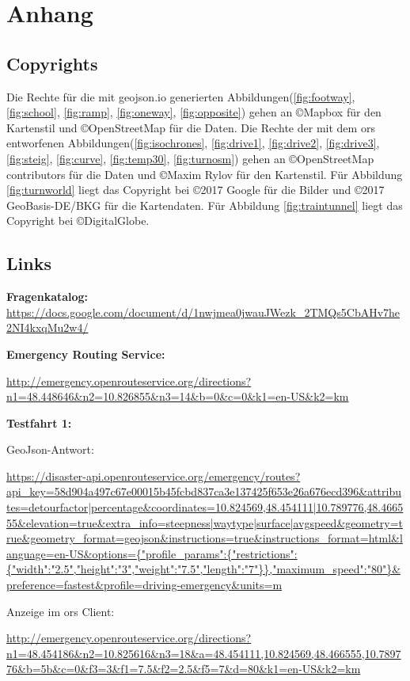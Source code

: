 \section{Anhang}
\label{sec:anhang}
\subsection*{Copyrights}
Die Rechte für die mit geojson.io generierten Abbildungen(\ref{fig:footway}, \ref{fig:school}, \ref{fig:ramp}, \ref{fig:oneway}, \ref{fig:opposite}) gehen an \copyright Mapbox für den Kartenstil und \copyright OpenStreetMap für die Daten.
\newline Die Rechte der mit dem \gls{ors} entworfenen Abbildungen(\ref{fig:isochrones}, \ref{fig:drive1}, \ref{fig:drive2}, \ref{fig:drive3}, \ref{fig:steig}, \ref{fig:curve}, \ref{fig:temp30}, \ref{fig:turnosm}) gehen an \copyright OpenStreetMap contributors für die Daten und \copyright Maxim Rylov für den Kartenstil.
Für Abbildung \ref{fig:turnworld} liegt das Copyright bei \copyright 2017 Google für die Bilder und \copyright 2017 GeoBasis-DE/BKG für die Kartendaten.
Für Abbildung \ref{fig:traintunnel} liegt das Copyright bei \copyright DigitalGlobe.

\subsection*{Links}
\textbf{Fragenkatalog:}
\sloppy
\url{https://docs.google.com/document/d/1nwjmea0jwauJWezk\_2TMQs5CbAHv7he2NI4kxqMu2w4/}
\medskip

\textbf{Emergency Routing Service:}

\url{http://emergency.openrouteservice.org/directions?n1=48.448646\&n2=10.826855\&n3=14\&b=0\&c=0\&k1=en-US\&k2=km}
\medskip

\textbf{Testfahrt 1:}

GeoJson-Antwort:\par
\url{https://disaster-api.openrouteservice.org/emergency/routes?api_key=58d904a497c67e00015b45fcbd837ca3e137425f653e26a676ecd396&attributes=detourfactor|percentage&coordinates=10.824569,48.454111|10.789776,48.466555&elevation=true&extra_info=steepness|waytype|surface|avgspeed&geometry=true&geometry_format=geojson&instructions=true&instructions_format=html&language=en-US&options={"profile_params":{"restrictions":{"width":"2.5","height":"3","weight":"7.5","length":"7"}},"maximum_speed":"80"}\&preference=fastest\&profile=driving-emergency\&units=m}
\medskip

Anzeige im \gls{ors} Client:\par
\url{http://emergency.openrouteservice.org/directions?n1=48.454186&n2=10.825616&n3=18&a=48.454111,10.824569,48.466555,10.789776&b=5b&c=0&f3=3&f1=7.5&f2=2.5&f5=7&d=80&k1=en-US&k2=km}
\medskip

